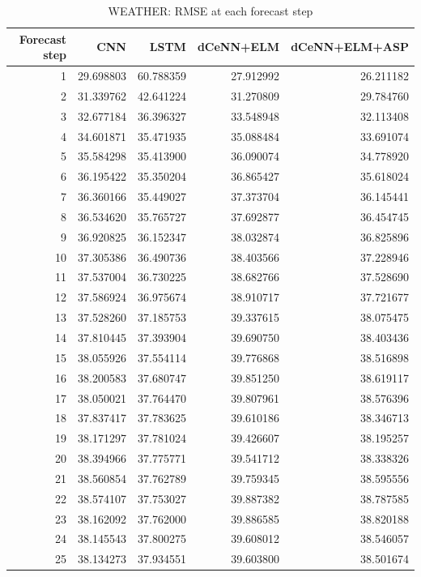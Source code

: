 \begin{table}
\caption{WEATHER: RMSE at each forecast step}
\begin{tabular}{rrrrr}
\toprule
Forecast step & CNN & LSTM & dCeNN+ELM & dCeNN+ELM+ASP \\
\midrule
1 & 29.698803 & 60.788359 & 27.912992 & 26.211182 \\
2 & 31.339762 & 42.641224 & 31.270809 & 29.784760 \\
3 & 32.677184 & 36.396327 & 33.548948 & 32.113408 \\
4 & 34.601871 & 35.471935 & 35.088484 & 33.691074 \\
5 & 35.584298 & 35.413900 & 36.090074 & 34.778920 \\
6 & 36.195422 & 35.350204 & 36.865427 & 35.618024 \\
7 & 36.360166 & 35.449027 & 37.373704 & 36.145441 \\
8 & 36.534620 & 35.765727 & 37.692877 & 36.454745 \\
9 & 36.920825 & 36.152347 & 38.032874 & 36.825896 \\
10 & 37.305386 & 36.490736 & 38.403566 & 37.228946 \\
11 & 37.537004 & 36.730225 & 38.682766 & 37.528690 \\
12 & 37.586924 & 36.975674 & 38.910717 & 37.721677 \\
13 & 37.528260 & 37.185753 & 39.337615 & 38.075475 \\
14 & 37.810445 & 37.393904 & 39.690750 & 38.403436 \\
15 & 38.055926 & 37.554114 & 39.776868 & 38.516898 \\
16 & 38.200583 & 37.680747 & 39.851250 & 38.619117 \\
17 & 38.050021 & 37.764470 & 39.807961 & 38.576396 \\
18 & 37.837417 & 37.783625 & 39.610186 & 38.346713 \\
19 & 38.171297 & 37.781024 & 39.426607 & 38.195257 \\
20 & 38.394966 & 37.775771 & 39.541712 & 38.338326 \\
21 & 38.560854 & 37.762789 & 39.759345 & 38.595556 \\
22 & 38.574107 & 37.753027 & 39.887382 & 38.787585 \\
23 & 38.162092 & 37.762000 & 39.886585 & 38.820188 \\
24 & 38.145543 & 37.800275 & 39.608012 & 38.546057 \\
25 & 38.134273 & 37.934551 & 39.603800 & 38.501674 \\

\end{tabular}
\end{table}
